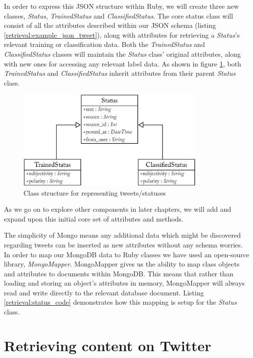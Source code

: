In order to express this JSON structure within Ruby, we will create three new classes, \emph{Status}, \emph{TrainedStatus} and \emph{ClassifiedStatus}. The core status class will consist of all the attributes described within our JSON schema (listing \ref{retrieval:example_json_tweet}), along with attributes for retrieving a \emph{Status}'s relevant training or classification data. Both the \emph{TrainedStatus} and \emph{ClassifiedStatus} classes will maintain the \emph{Status} class' original attributes, along with new ones for accessing any relevant label data. As shown in figure \ref{fig:status_uml}, both \emph{TrainedStatus} and \emph{ClassifiedStatus} inherit attributes from their parent \emph{Status} class.

\begin{figure}[h!]
	\caption{Class structure for representing tweets/statuses}
	\label{fig:status_uml}
	\centering
	\includegraphics[width=0.83\textwidth]{figures/status_uml_class_diagram.eps}
\end{figure}

As we go on to explore other components in later chapters, we will add and expand upon this initial core set of attributes and methods. 

The simplicity of Mongo means any additional data which might be discovered regarding tweets can be inserted as new attributes without any schema worries. In order to map our MongoDB data to Ruby classes we have used an open-source library, \emph{MongoMapper}. MongoMapper gives us the ability to map class objects and attributes to documents within MongoDB. This means that rather than loading and storing an object's attributes in memory, MongoMapper will always read and write directly to the relevant database document. Listing \ref{retrieval:status_code} demonstrates how this mapping is setup for the \emph{Status} class.

\section{Retrieving content on Twitter}

